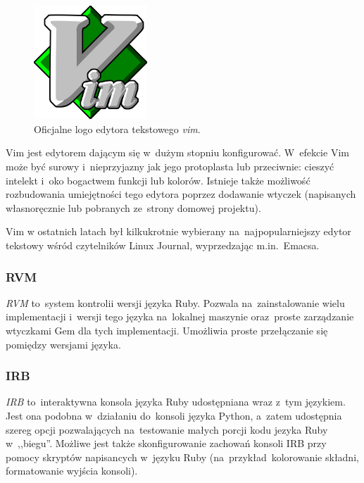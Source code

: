 \begin{figure}
  \begin{center}
    \includegraphics[width=0.38\textwidth]{obrazki/vim_logo.png}
  \end{center}
  \caption{Oficjalne logo edytora tekstowego \textit{vim}.}
\end{figure}

Vim jest edytorem dającym się w~dużym stopniu konfigurować. W~efekcie Vim może być surowy i~nieprzyjazny jak jego protoplasta lub przeciwnie: cieszyć intelekt i~oko bogactwem funkcji lub kolorów. Istnieje także możliwość rozbudowania umiejętności tego edytora poprzez dodawanie wtyczek (napisanych własnoręcznie lub pobranych ze~strony domowej projektu).


Vim w ostatnich latach był kilkukrotnie wybierany na~najpopularniejszy edytor tekstowy wśród czytelników Linux Journal, wyprzedzając m.in.~Emacsa.

\subsubsection{RVM}

\textit{RVM}\cite{rvm} to~system kontrolii wersji języka Ruby. Pozwala na~zainstalowanie wielu implementacji i~wersji tego języka na~lokalnej maszynie oraz~proste zarządzanie wtyczkami Gem dla tych implementacji. Umożliwia proste przełączanie się pomiędzy wersjami języka.

\subsubsection{IRB}

\textit{IRB} to~interaktywna konsola języka Ruby udostępniana wraz z~tym językiem. Jest ona podobna w~działaniu do~konsoli języka Python, a~zatem udostępnia szereg opcji pozwalających na~testowanie małych porcji kodu jezyka Ruby w~,,biegu''. Możliwe jest także skonfigurowanie zachowań konsoli IRB przy pomocy skryptów napisancych w~języku Ruby (na~przykład~kolorowanie składni, formatowanie wyjścia konsoli).

